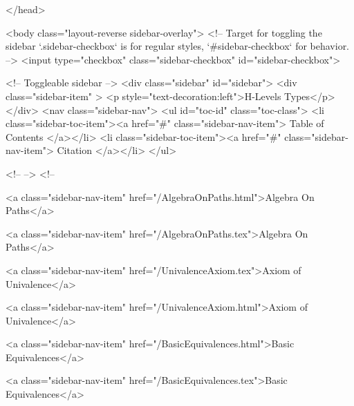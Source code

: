   
</head>




  <body class="layout-reverse sidebar-overlay">
    <!-- Target for toggling the sidebar `.sidebar-checkbox` is for regular
     styles, `#sidebar-checkbox` for behavior. -->
<input type="checkbox" class="sidebar-checkbox" id="sidebar-checkbox">

<!-- Toggleable sidebar -->
<div class="sidebar" id="sidebar">
  <div class="sidebar-item" >
    <p style="text-decoration:left">H-Levels Types</p>
  </div>
  <nav class="sidebar-nav">
    <ul id="toc-id" class="toc-class">
  <li class="sidebar-toc-item"><a href="#" class="sidebar-nav-item"> Table of Contents </a></li>
  <li class="sidebar-toc-item"><a href="#" class="sidebar-nav-item"> Citation </a></li>
</ul>


    <!--  -->
    <!-- 
      
    
      
    
      
    
      
    
      
        
      
    
      
        
          <a class="sidebar-nav-item" href="/AlgebraOnPaths.html">Algebra On Paths</a>
        
      
    
      
        
          <a class="sidebar-nav-item" href="/AlgebraOnPaths.tex">Algebra On Paths</a>
        
      
    
      
        
          <a class="sidebar-nav-item" href="/UnivalenceAxiom.tex">Axiom of Univalence</a>
        
      
    
      
        
          <a class="sidebar-nav-item" href="/UnivalenceAxiom.html">Axiom of Univalence</a>
        
      
    
      
        
          <a class="sidebar-nav-item" href="/BasicEquivalences.html">Basic Equivalences</a>
        
      
    
      
        
          <a class="sidebar-nav-item" href="/BasicEquivalences.tex">Basic Equivalences</a>
        
